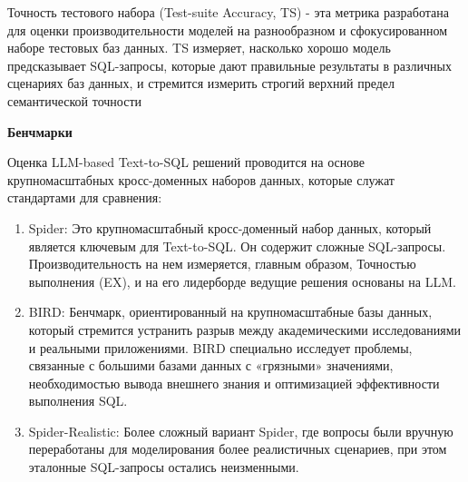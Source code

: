 Точность тестового набора (Test-suite Accuracy, TS) - эта метрика разработана для оценки производительности моделей на разнообразном и сфокусированном наборе тестовых баз данных. TS измеряет, насколько хорошо модель предсказывает SQL-запросы, которые дают правильные результаты в различных сценариях баз данных, и стремится измерить строгий верхний предел семантической точности

\textbf{Бенчмарки}

Оценка LLM-based Text-to-SQL решений проводится на основе крупномасштабных кросс-доменных наборов данных, которые служат стандартами для сравнения:

\begin{enumerate}
    \item Spider: Это крупномасштабный кросс-доменный набор данных, который является ключевым для Text-to-SQL. Он содержит сложные SQL-запросы. Производительность на нем измеряется, главным образом, Точностью выполнения (EX), и на его лидерборде ведущие решения основаны на LLM.
    \item BIRD: Бенчмарк, ориентированный на крупномасштабные базы данных, который стремится устранить разрыв между академическими исследованиями и реальными приложениями. BIRD специально исследует проблемы, связанные с большими базами данных с «грязными» значениями, необходимостью вывода внешнего знания и оптимизацией эффективности выполнения SQL.
    \item Spider-Realistic: Более сложный вариант Spider, где вопросы были вручную переработаны для моделирования более реалистичных сценариев, при этом эталонные SQL-запросы остались неизменными.
\end{enumerate}





